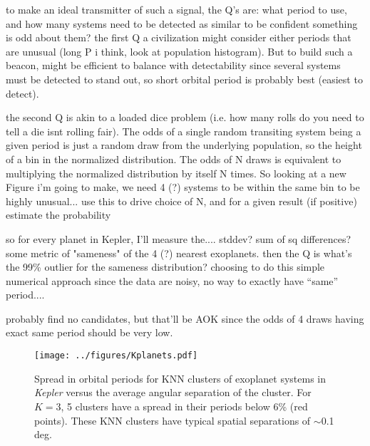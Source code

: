 \documentclass[twocolumn]{aastex62}
\newcommand{\Kepler}{\textsl{Kepler}\xspace}
\begin{document}
to make an ideal transmitter of such a signal, the Q's are: what period to use, and how many systems need to be detected as similar to be confident something is odd about them? the first Q a civilization might consider either periods that are unusual (long P i think, look at population histogram). But to build such a beacon, might be efficient to balance with detectability since several systems must be detected to stand out, so short orbital period is probably best (easiest to detect). 

the second Q is akin to a loaded dice problem (i.e. how many rolls do you need to tell a die isnt rolling fair). The odds of a single random transiting system being a given period is just a random draw from the underlying population, so the height of a bin in the normalized distribution. The odds of N draws is equivalent to multiplying the normalized distribution by itself N times. So looking at a new Figure i'm going to make, we need 4 (?) systems to be within the same bin to be highly unusual... use this to drive choice of N, and for a given result (if positive) estimate the probability

so for every planet in Kepler, I'll measure the.... stddev? sum of sq differences? some metric of "sameness"
of the 4 (?) nearest exoplanets.
then the Q is what's the  99\% outlier for the sameness distribution?
choosing to do this simple numerical approach since the data are noisy, no way to exactly have ``same'' period....

probably find no candidates, but that'll be AOK since the odds of 4 draws having exact same period should be very low.



\begin{figure}[!t]
\centering
\texttt{[image: ../figures/Kplanets.pdf]}
\caption{Spread in orbital periods for KNN clusters of exoplanet systems in \Kepler versus the average angular separation of the cluster. For $K=3$, 5 clusters have a spread in their periods below 6\% (red points). These KNN clusters have typical spatial separations of $\sim$0.1 deg.}
\label{fig:knn}
\end{figure}






\end{document}
